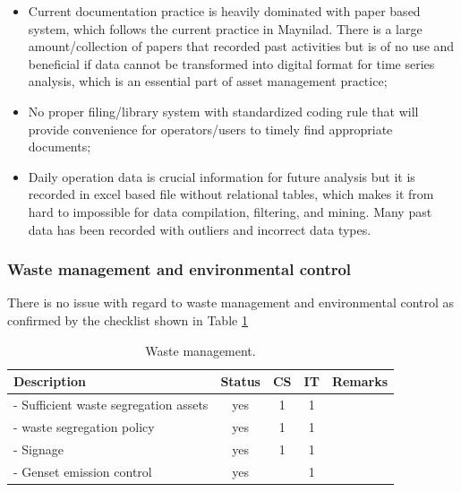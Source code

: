 \begin{itemize}
\item Current documentation practice is heavily dominated with paper based system, which follows the current practice in Maynilad. There is a large amount/collection of papers that recorded past activities but is of no use and beneficial if data cannot be transformed into digital format for time series analysis, which is an essential part of asset management practice;

\item No proper filing/library system with standardized coding rule that will provide convenience for operators/users to timely find appropriate documents;

\item Daily operation data is crucial information for future analysis but it is recorded in excel based file without relational tables, which makes it from hard to impossible for data compilation, filtering, and mining. Many past data has been recorded with outliers and incorrect data types. 

\end{itemize}

 





\subsubsection{Waste management and environmental control}
There is no issue with regard to waste management and environmental control as confirmed by the checklist shown in Table \ref{ch05_tbl_housekeeping}

\begin{table}[h]
	\caption{Waste management.}
	\label{ch05_tbl_housekeeping}
	{\footnotesize
	\begin{tabular}{l|c|c|c|l}
		\hline
		Description & Status & CS & IT & Remarks \\ 
		\hline
		- Sufficient waste segregation assets & yes & 1 & 1 &  \\ 
		- waste segregation policy & yes & 1 & 1 &  \\ 
		- Signage & yes & 1 & 1 &  \\ 
		- Genset emission control & yes &  & 1 &  \\ 
		\hline
	\end{tabular}	
	}
\end{table}


